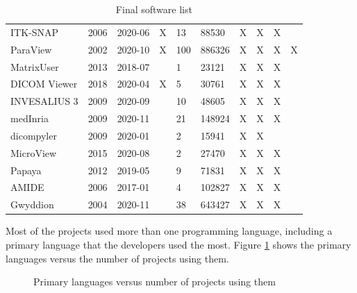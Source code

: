 \begin{table}[H]
\begin{tabular}{llllllllll}
ITK-SNAP \cite{Yushkevich2006} & 2006 & 2020-06 & X & 13 & 88530 & X & X & X &  \\
ParaView \cite{Ahrens2005} & 2002 & 2020-10 & X & 100 & 886326 & X & X & X & X \\
MatrixUser \cite{Liu2016} & 2013 & 2018-07 &  & 1 & 23121 & X & X & X &  \\
DICOM Viewer \cite{Afsar2021} & 2018 & 2020-04 & X & 5 & 30761 & X & X & X &  \\
INVESALIUS 3 \cite{Amorim2015} & 2009 & 2020-09 &  & 10 & 48605 & X & X & X &  \\
medInria \cite{Fillard2012} & 2009 & 2020-11 &  & 21 & 148924 & X & X & X &  \\
dicompyler \cite{Panchal2010} & 2009 & 2020-01 &  & 2 & 15941 & X & X &  &  \\
MicroView \cite{ParallaxInnovations2020} & 2015 & 2020-08 &  & 2 & 27470 & X & X & X &  \\
Papaya \cite{UTHSCSA2019} & 2012 & 2019-05 &  & 9 & 71831 & X & X & X &  \\
AMIDE \cite{Loening2017} & 2006 & 2017-01 &  & 4 & 102827 & X & X & X &  \\
Gwyddion \cite{Nevcas2012} & 2004 & 2020-11 &  & 38 & 643427 & X & X & X &  \\
\hline
\end{tabular}
\caption{\label{tab_final_list}Final software list}
\end{table}

Most of the projects used more than one programming language, including a primary language that the developers used the most. Figure \ref{fig_language} shows the primary languages versus the number of projects using them.

\begin{figure}[H]
\centering
{}
\caption{\label{fig_language}Primary languages versus number of projects using them}
\end{figure}

